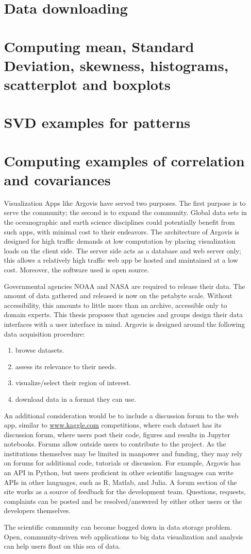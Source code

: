 \section{Data downloading}
\section{Computing mean, Standard Deviation, skewness, histograms, scatterplot and boxplots}

\section{SVD examples for patterns}

\section{Computing examples of correlation and covariances}

Visualization Apps like Argovis have served two purposes. The first purpose is to serve the community; the second is to expand the community. Global data sets in the oceanographic and earth science disciplines could potentially benefit from such apps, with minimal cost to their endeavors. The architecture of Argovis is designed for high traffic demands at low computation by placing visualization loads on the client side. The server side acts as a database and web server only; this allows a relatively high traffic web app be hosted and maintained at a low cost. Moreover, the software used is open source. 

Governmental agencies NOAA and NASA are required to release their data. The amount of data gathered and released is now on the petabyte scale. Without accessibility, this amounts to little more than an archive, accessible only to domain experts. This thesis proposes that agencies and groups design their data interfaces with a user interface in mind. Argovis is designed around the following data acquisition procedure: 
\begin{enumerate}
  \item browse datasets. 
  \item assess its relevance to their needs.
  \item visualize/select their region of interest.
  \item download data in a format they can use.
\end{enumerate}
An additional consideration would be to include a discussion forum to the web app, similar to \url{www.kaggle.com} \cite{kaggle} competitions, where each dataset has its discussion forum, where users post their code, figures and results in \gls{Jupyter} notebooks. Forums allow outside users to contribute to the project. As the institutions themselves may be limited in manpower and funding, they may rely on forums for additional code, tutorials or discussion. For example, Argovis has an API in Python, but users proficient in other scientific languages can write APIs in other languages, such as R, Matlab, and Julia. A forum section of the site works as a source of feedback for the development team. Questions, requests, complaints can be posted and be resolved/answered by either other users or the developers themselves.

The scientific community can become bogged down in data storage problem. Open, community-driven web applications to big data visualization and analysis can help users float on this sea of data.